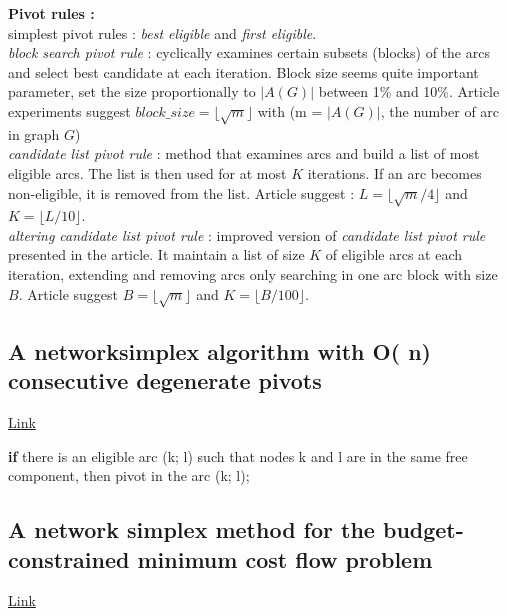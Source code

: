 \documentclass{article}
\begin{document}
\noindent\textbf{Pivot rules :}\\
\noindent simplest pivot rules : \textit{best eligible} and \textit{first eligible}.\\

\noindent\textit{block search pivot rule} : cyclically examines certain subsets (blocks) of the arcs and select best candidate at each iteration. Block size seems quite important parameter, set the size proportionally to $|A(G)|$ between 1\% and 10\%. Article experiments suggest $block\_size = \lfloor\sqrt{m}\rfloor$ with (m = $|A(G)|$, the number of arc in graph $G$)\\

\noindent\textit{candidate list pivot rule} : method that examines arcs and build a list of most eligible arcs. The list is then used for at most $K$ iterations. If an arc becomes non-eligible, it is removed from the list. Article suggest : $L = \lfloor\sqrt{m}/4\rfloor$ and $K = \lfloor L/10\rfloor$.\\

\noindent\textit{altering candidate list pivot rule} : improved version of \textit{candidate list pivot rule} presented in the article. It maintain a list of size $K$ of eligible arcs at each iteration, extending and removing arcs only searching in one arc block with size $B$. Article suggest $B = \lfloor\sqrt{m}\rfloor$ and $K = \lfloor B/100\rfloor$.

\subsection*{A networksimplex algorithm with O( n) consecutive degenerate pivots}
\href{https://www.sciencedirect.com/science/article/abs/pii/S0377221716309493?casa_token=SMqEV_sxidsAAAAA:3CR4u27p_VI9Bk48yrlLN0HKp-sdVPk_YAORscbmIe7yMcQ-zb935FCKALHu8hFgY9NAUE_JDXY}{Link}

\textbf{if} there is an eligible arc (k; l) such that nodes k and l are in the same free component, then pivot in the arc (k; l);

\subsection*{A network simplex method for the budget-constrained minimum cost flow problem}
\href{https://www.sciencedirect.com/science/article/abs/pii/S0167637702001141?casa_token=Iofw98BgAS0AAAAA:1ULyjeo9cNWUvxOTDPwAj6DMAjnyZmUGLdUGYDWC3CJ_bJVmBRHRPKLiZ8yYPMHjEYUtgQfb5B8}{Link}
\end{document}
